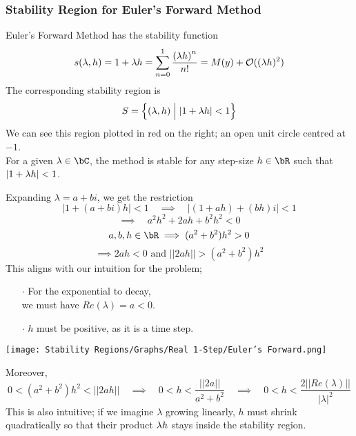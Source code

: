 \subsubsection{Stability Region for Euler's Forward Method}
\begin{multicols}{2}
Euler's Forward Method has the stability function
\[s(\lambda, h) = 1 + \lambda h = \sum\limits_{n=0}^{1} \frac{{(\lambda h)}^n}{n!} = M(y) + \mathcal{O}((\lambda h)^2)\]
The corresponding stability region is 
\[S = \Big\{ (\lambda, h) \;\Big|\; |1 + \lambda h| < 1\Big\}\]
We can see this region plotted in red on the right; an open unit circle centred at $-1$.\\

For a given $\lambda \in \bC$, the method is stable for any step-size $h \in \bR$ such that $|1 + \lambda h| < 1$.\\

\par Expanding $\lambda = a + bi$, we get the restriction
\[|1 + (a + bi)h| < 1 \quad \implies \quad |(1+ah) + (bh)i| < 1\] 
\[\implies \quad a^2h^2 + 2ah + b^2h^2 < 0\]
\[a, b, h \in \bR \implies (a^2 +b^2)h^2 > 0\] 
\[\implies 2ah < 0 \text{ and } ||2ah|| > (a^2 + b^2)h^2\]
This aligns with our intuition for the problem;
\begin{itemize}
	\item[$\cdot$] For the exponential to decay,\\
	      we must have $Re(\lambda) = a < 0$.
	\item[$\cdot$] $h$ must be positive, as it is a time step.
\end{itemize}
\columnbreak{}
\vspace*{\fill}
\begin{center}
\texttt{[image: Stability Regions/Graphs/Real 1-Step/Euler's Forward.png]}
\end{center}
\vspace*{\fill}
\end{multicols}
Moreover, 
\[0 < (a^2 +b^2)h^2< ||2ah|| \quad\implies\quad 0 < h < \frac{||2a||}{a^2 + b^2} \quad\implies\quad 0 < h < \frac{2 ||Re(\lambda)||}{{|\lambda|}^2}\]
This is also intuitive; if we imagine $\lambda$ growing linearly, $h$ must shrink quadratically so that their product $\lambda h$ stays inside the stability region.\\

